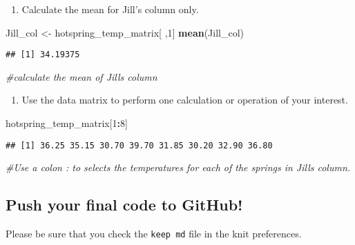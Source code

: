 \documentclass[
]{article}
\newenvironment{Shaded}{\begin{snugshade}}{\end{snugshade}}
\newcommand{\CommentTok}[1]{\textcolor[rgb]{0.56,0.35,0.01}{\textit{#1}}}
\newcommand{\DecValTok}[1]{\textcolor[rgb]{0.00,0.00,0.81}{#1}}
\newcommand{\FunctionTok}[1]{\textcolor[rgb]{0.13,0.29,0.53}{\textbf{#1}}}
\newcommand{\NormalTok}[1]{#1}
\newcommand{\OtherTok}[1]{\textcolor[rgb]{0.56,0.35,0.01}{#1}}
\newcommand{\SpecialCharTok}[1]{\textcolor[rgb]{0.81,0.36,0.00}{\textbf{#1}}}
\providecommand{\tightlist}{%
  \setlength{\itemsep}{0pt}\setlength{\parskip}{0pt}}
\begin{document}
\begin{enumerate}
\def\labelenumi{\arabic{enumi}.}
\setcounter{enumi}{8}
\tightlist
\item
  Calculate the mean for Jill's column only.
\end{enumerate}

\begin{Shaded}
\begin{Highlighting}[]
\NormalTok{Jill\_col }\OtherTok{\textless{}{-}}\NormalTok{ hotspring\_temp\_matrix[ ,}\DecValTok{1}\NormalTok{]}
\FunctionTok{mean}\NormalTok{(Jill\_col)}
\end{Highlighting}
\end{Shaded}

\begin{verbatim}
## [1] 34.19375
\end{verbatim}

\begin{Shaded}
\begin{Highlighting}[]
\CommentTok{\#calculate the mean of Jill\textquotesingle{}s column}
\end{Highlighting}
\end{Shaded}

\begin{enumerate}
\def\labelenumi{\arabic{enumi}.}
\setcounter{enumi}{9}
\tightlist
\item
  Use the data matrix to perform one calculation or operation of your
  interest.
\end{enumerate}

\begin{Shaded}
\begin{Highlighting}[]
\NormalTok{hotspring\_temp\_matrix[}\DecValTok{1}\SpecialCharTok{:}\DecValTok{8}\NormalTok{]}
\end{Highlighting}
\end{Shaded}

\begin{verbatim}
## [1] 36.25 35.15 30.70 39.70 31.85 30.20 32.90 36.80
\end{verbatim}

\begin{Shaded}
\begin{Highlighting}[]
\CommentTok{\#Use a colon \textasciigrave{}:\textasciigrave{} to selects the temperatures for each of the springs in Jill\textquotesingle{}s column. }
\end{Highlighting}
\end{Shaded}

\hypertarget{push-your-final-code-to-github}{%
\subsection{Push your final code to
GitHub!}\label{push-your-final-code-to-github}}

Please be sure that you check the \texttt{keep\ md} file in the knit
preferences.
\end{document}
